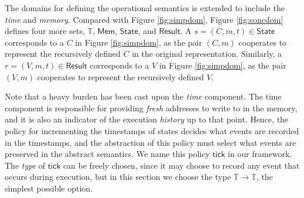 \documentclass[acmsmall,review]{acmart}\settopmatter{printfolios=true,printccs=false,printacmref=false}
\theoremstyle{definition}
\theoremstyle{plain}
\newcommand*{\Time}{\mathbb{T}}
\newcommand*{\Mem}{\mathsf{Mem}}
\newcommand*{\mem}{m}
\newcommand*{\State}{\mathsf{State}}
\newcommand*{\Result}{\mathsf{Result}}
\newcommand*{\tick}{\mathsf{tick}}
\begin{document}
The domains for defining the operational semantics is extended to include the \emph{time} and \emph{memory}.
Compared with Figure \ref{fig:simpdom}, Figure \ref{fig:concdom} defines four more sets, $\Time$, $\Mem$, $\State$, and $\Result$.
A $s=(C,\mem,t)\in\State$ corresponds to a $C$ in Figure \ref{fig:simpdom}, as the pair $(C,\mem)$ cooperates to represent the recursively defined $C$ in the original representation.
Similarly, a $r=(V,\mem,t)\in\Result$ corresponds to a $V$ in Figure \ref{fig:simpdom}, as the pair $(V,\mem)$ cooperates to represent the recursively defined $V$.

Note that a heavy burden has been cast upon the \emph{time} component.
The time component is responsible for providing \emph{fresh} addresses to write to in the memory, and it is also an indicator of the execution \emph{history} up to that point.
Hence, the policy for incrementing the timestamps of states decides what events are recorded in the timestamps, and the abstraction of this policy must select what events are preserved in the abstract semantics.
We name this policy $\tick$ in our framework.
The \emph{type} of $\tick$ can be freely chosen, since it may choose to record any event that occurs during execution, but in this section we choose the type $\Time\rightarrow\Time$, the simplest possible option.
\end{document}
